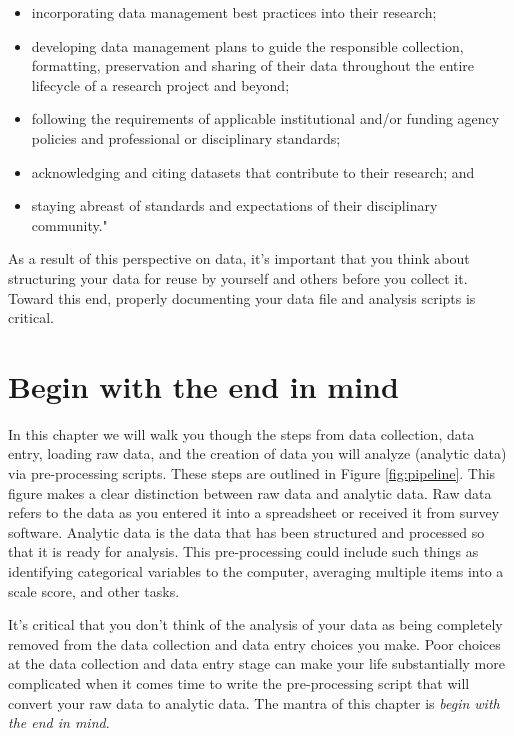 \documentclass[
]{krantz}
\providecommand{\tightlist}{%
  \setlength{\itemsep}{0pt}\setlength{\parskip}{0pt}}
\begin{document}
\begin{itemize}
\tightlist
\item
  incorporating data management best practices into their research;
\item
  developing data management plans to guide the responsible collection, formatting, preservation and sharing of their data throughout the entire lifecycle of a research project and beyond;
\item
  following the requirements of applicable institutional and/or funding agency policies and professional or disciplinary standards;
\item
  acknowledging and citing datasets that contribute to their research; and
\item
  staying abreast of standards and expectations of their disciplinary community."
\end{itemize}

As a result of this perspective on data, it's important that you think about structuring your data for reuse by yourself and others before you collect it. Toward this end, properly documenting your data file and analysis scripts is critical.

\hypertarget{begin-with-the-end-in-mind}{%
\section{Begin with the end in mind}\label{begin-with-the-end-in-mind}}

In this chapter we will walk you though the steps from data collection, data entry, loading raw data, and the creation of data you will analyze (analytic data) via pre-processing scripts. These steps are outlined in Figure \ref{fig:pipeline}. This figure makes a clear distinction between raw data and analytic data. Raw data refers to the data as you entered it into a spreadsheet or received it from survey software. Analytic data is the data that has been structured and processed so that it is ready for analysis. This pre-processing could include such things as identifying categorical variables to the computer, averaging multiple items into a scale score, and other tasks.

It's critical that you don't think of the analysis of your data as being completely removed from the data collection and data entry choices you make. Poor choices at the data collection and data entry stage can make your life substantially more complicated when it comes time to write the pre-processing script that will convert your raw data to analytic data. The mantra of this chapter is \emph{begin with the end in mind}.
\end{document}
